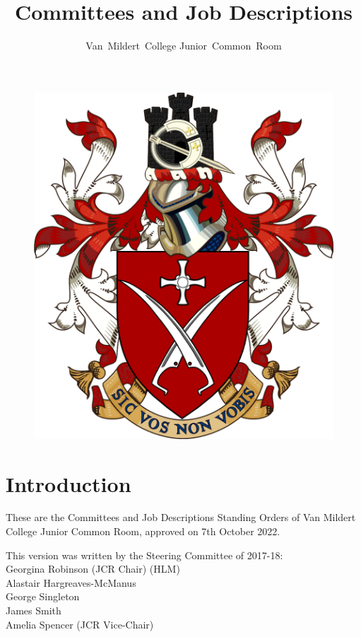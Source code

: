 \documentclass[12pt]{article}
\title{Committees and Job Descriptions}
\author{Van~Mildert~College Junior~Common~Room}
\date{\thedate}
\newcommand{\thedate}{7th October 2022}
\begin{document}
\begin{titlepage}  %
    \maketitle
    \begin{figure}[h]
    \includegraphics[scale=0.25]{arms}  %
    \centering
    \end{figure}
    \thispagestyle{empty}
\end{titlepage}

\setcounter{page}{2}  %
\section*{Introduction}
These are the Committees and Job Descriptions Standing Orders of Van Mildert College Junior Common Room, approved on \thedate.

This version was written by the Steering Committee of 2017-18:\\
\hspace*{2cm}Georgina Robinson (JCR Chair) (HLM)\\
\hspace*{2cm}Alastair Hargreaves-McManus\\
\hspace*{2cm}George Singleton\\
\hspace*{2cm}James Smith\\
\hspace*{2cm}Amelia Spencer (JCR Vice-Chair)
\end{document}
